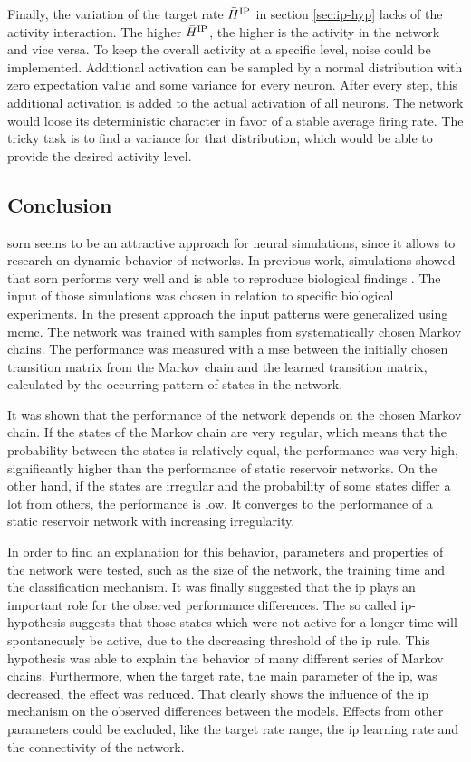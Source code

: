 Finally, the variation of the target rate $\bar H^{\text{IP}}$ in section \ref{sec:ip-hyp} lacks of the activity interaction. The higher $\bar H^{\text{IP}}$, the higher is the activity in the network and vice versa. To keep the overall activity at a specific level, noise could be implemented. Additional activation can be sampled by a normal distribution with zero expectation value and some variance for every neuron. After every step, this additional activation is added to the actual activation of all neurons. The network would loose its deterministic character in favor of a stable average firing rate. The tricky task is to find a variance for that distribution, which would be able to provide the desired activity level.

\subsection{Conclusion}

\acs{sorn} seems to be an attractive approach for neural simulations, since it allows to research on dynamic behavior of networks. In previous work, simulations showed that \acs{sorn} performs very well and is able to reproduce biological findings \parencite{lazar2009sorn, zheng2013network,  aswolinskiy2015rm, hartmann2015s}. The input of those simulations was chosen in relation to specific biological experiments. In the present approach the input patterns were generalized using \acl{mcmc}. The network was trained with samples from systematically chosen Markov chains. The performance was measured with a \acl{mse} between the initially chosen transition matrix from the Markov chain and the learned transition matrix, calculated by the occurring pattern of states in the network.

It was shown that the performance of the network depends on the chosen Markov chain. If the states of the Markov chain are very regular, which means that the probability between the states is relatively equal, the performance was very high, significantly higher than the performance of static reservoir networks. On the other hand, if the states are irregular and the probability of some states differ a lot from others, the performance is low. It converges to the performance of a static reservoir network with increasing irregularity.

In order to find an explanation for this behavior, parameters and properties of the network were tested, such as the size of the network, the training time and the classification mechanism. It was finally suggested that the \acl{ip} plays an important role for the observed performance differences. The so called \acs{ip}-hypothesis suggests that those states which were not active for a longer time will spontaneously be active, due to the decreasing threshold of the \acs{ip} rule. This hypothesis was able to explain the behavior of many different series of Markov chains. Furthermore, when the target rate, the main parameter of the \acl{ip}, was decreased, the effect was reduced. That clearly shows the influence of the \acs{ip} mechanism on the observed differences between the models. Effects from other parameters could be excluded, like the target rate range, the \acs{ip} learning rate and the connectivity of the network.

